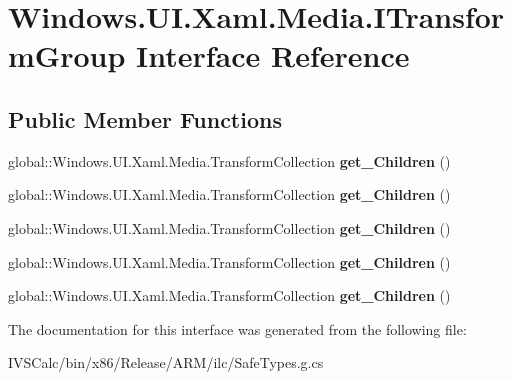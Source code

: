 \hypertarget{interface_windows_1_1_u_i_1_1_xaml_1_1_media_1_1_i_transform_group}{}\section{Windows.\+U\+I.\+Xaml.\+Media.\+I\+Transform\+Group Interface Reference}
\label{interface_windows_1_1_u_i_1_1_xaml_1_1_media_1_1_i_transform_group}
\subsection*{Public Member Functions}
\begin{DoxyCompactItemize}
\item 
\mbox{\label{interface_windows_1_1_u_i_1_1_xaml_1_1_media_1_1_i_transform_group_a96f8ed5243c148b2341e82861b788756}} 
global\+::\+Windows.\+U\+I.\+Xaml.\+Media.\+Transform\+Collection {\bfseries get\+\_\+\+Children} ()
\item 
\mbox{\label{interface_windows_1_1_u_i_1_1_xaml_1_1_media_1_1_i_transform_group_a96f8ed5243c148b2341e82861b788756}} 
global\+::\+Windows.\+U\+I.\+Xaml.\+Media.\+Transform\+Collection {\bfseries get\+\_\+\+Children} ()
\item 
\mbox{\label{interface_windows_1_1_u_i_1_1_xaml_1_1_media_1_1_i_transform_group_a96f8ed5243c148b2341e82861b788756}} 
global\+::\+Windows.\+U\+I.\+Xaml.\+Media.\+Transform\+Collection {\bfseries get\+\_\+\+Children} ()
\item 
\mbox{\label{interface_windows_1_1_u_i_1_1_xaml_1_1_media_1_1_i_transform_group_a96f8ed5243c148b2341e82861b788756}} 
global\+::\+Windows.\+U\+I.\+Xaml.\+Media.\+Transform\+Collection {\bfseries get\+\_\+\+Children} ()
\item 
\mbox{\label{interface_windows_1_1_u_i_1_1_xaml_1_1_media_1_1_i_transform_group_a96f8ed5243c148b2341e82861b788756}} 
global\+::\+Windows.\+U\+I.\+Xaml.\+Media.\+Transform\+Collection {\bfseries get\+\_\+\+Children} ()
\end{DoxyCompactItemize}


The documentation for this interface was generated from the following file\+:\begin{DoxyCompactItemize}
\item 
I\+V\+S\+Calc/bin/x86/\+Release/\+A\+R\+M/ilc/Safe\+Types.\+g.\+cs\end{DoxyCompactItemize}
